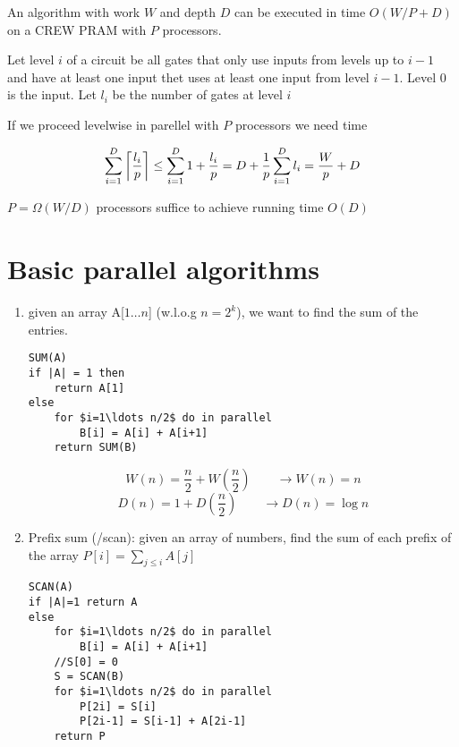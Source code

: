 \begin{thm} An algorithm with work $W$ and depth $D$ can be executed in time $O(W/P+D)$ on a CREW PRAM with $P$ processors.\end{thm}

\begin{pr} Let level $i$ of a circuit be all gates that only use inputs from levels up to $i-1$ and have at least one input thet uses at least one input from level $i-1$. Level 0 is the input. Let $l_i$ be the number of gates at level $i$

If we proceed levelwise in parellel with $P$ processors we need time

\[\sum_{i=1}^D \left\lceil \frac{l_i}{p} \right\rceil\leq \sum_{i=1}^D 1+\frac{l_i}{p} = D+\frac 1p \sum_{i=1}^D l_i = \frac Wp +D\]

\end{pr}

\begin{cor} $P= \Omega(W/D)$ processors suffice to achieve running time $O(D)$\end{cor}

\section{Basic parallel algorithms}

\begin{enumerate}
\item given an array A[$1\ldots n$] (w.l.o.g $n=2^k$), we want to find the sum of the entries. 

\begin{lstlisting}
SUM(A) 
if |A| = 1 then
	return A[1]
else
	for $i=1\ldots n/2$ do in parallel
		B[i] = A[i] + A[i+1]
	return SUM(B)
\end{lstlisting}

\[W(n) = \frac n2 + W(\frac n2) \qquad \rightarrow W(n) = n\]
\[D(n) = 1 + D(\frac n2) \qquad \rightarrow D(n) = \log n\]
\item Prefix sum (/scan): given an array of numbers, find the sum of each prefix of the array $P[i] = \sum_{j\leq i} A[j]$

\begin{lstlisting}
SCAN(A)
if |A|=1 return A
else
	for $i=1\ldots n/2$ do in parallel
		B[i] = A[i] + A[i+1]
	//S[0] = 0
	S = SCAN(B)
	for $i=1\ldots n/2$ do in parallel
		P[2i] = S[i]
		P[2i-1] = S[i-1] + A[2i-1]
	return P
\end{lstlisting}

\end{enumerate}
